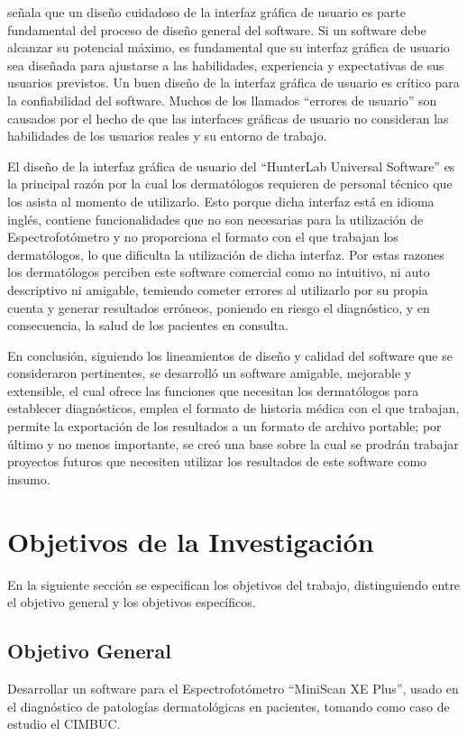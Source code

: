 \cite{Sommerville} se\~{n}ala que un dise\~{n}o cuidadoso de la interfaz gr\'{a}fica de usuario es parte fundamental del proceso de dise\~{n}o general del software. Si un software debe alcanzar su potencial m\'{a}ximo, es fundamental que su interfaz gr\'{a}fica de usuario sea dise\~{n}ada para ajustarse a las habilidades, experiencia y expectativas de sus usuarios previstos. Un buen dise\~{n}o de la interfaz gr\'{a}fica de usuario es cr\'{i}tico para la confiabilidad del software. Muchos de los llamados ``errores de usuario'' son causados por el hecho de que las interfaces gr\'{a}ficas de usuario no consideran las habilidades de los usuarios reales y su entorno de trabajo.

El dise\~{n}o de la interfaz gr\'{a}fica de usuario del ``HunterLab Universal Software'' es la principal raz\'{o}n por la cual los dermat\'{o}logos requieren de personal t\'{e}cnico que los asista al momento de utilizarlo. Esto porque dicha interfaz est\'{a} en idioma ingl\'{e}s, contiene funcionalidades que no son necesarias para la utilizaci\'{o}n de Espectrofot\'{o}metro y no proporciona el formato con el que trabajan los dermat\'{o}logos, lo que dificulta la utilizaci\'{o}n de dicha interfaz. Por estas razones los dermat\'{o}logos perciben este software comercial como no intuitivo, ni auto descriptivo ni amigable, temiendo cometer errores al utilizarlo por su propia cuenta y generar resultados err\'{o}neos, poniendo en riesgo el diagn\'{o}stico, y en consecuencia, la salud de los pacientes en consulta.

En conclusi\'{o}n, siguiendo los lineamientos de dise\~{n}o y calidad del software que se consideraron pertinentes, se desarroll\'{o} un software amigable, mejorable y extensible, el cual ofrece las funciones que necesitan los dermat\'{o}logos para establecer diagn\'{o}sticos, emplea el formato de historia m\'{e}dica con el que trabajan, permite la exportaci\'{o}n de los resultados a un formato de archivo portable; por \'{u}ltimo y no menos importante, se cre\'{o} una base sobre la cual se prodr\'{a}n trabajar proyectos futuros que necesiten utilizar los resultados de este software como insumo.
	\newpage

	\section{Objetivos de la Investigaci\'{o}n}
En la siguiente secci\'{o}n se especifican los objetivos del trabajo, distinguiendo entre el objetivo general y los objetivos espec\'{i}ficos.
		\subsection{Objetivo General}
	Desarrollar un software para el Espectrofot\'{o}metro ``MiniScan XE Plus'', usado en el diagn\'{o}stico de patolog\'{i}as dermatol\'{o}gicas en pacientes, tomando como caso de estudio el CIMBUC.
